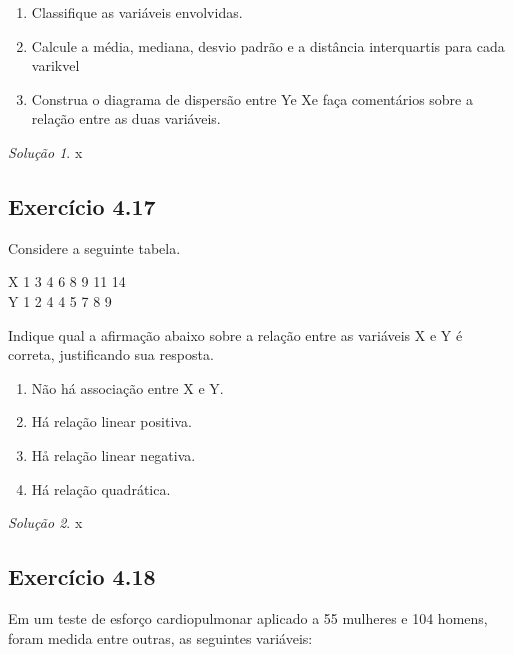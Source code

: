 \documentclass[
]{latex/krantz}
\providecommand{\tightlist}{%
  \setlength{\itemsep}{0pt}\setlength{\parskip}{0pt}}
\theoremstyle{definition}
\theoremstyle{definition}
\theoremstyle{definition}
\theoremstyle{definition}
\theoremstyle{remark}
\newtheorem*{solution}{Solução}
\begin{document}
\begin{enumerate}
\def\labelenumi{\alph{enumi}.}
\tightlist
\item
  Classifique as variáveis envolvidas.
\item
  Calcule a média, mediana, desvio padrão e a distância interquartis para cada varikvel
\item
  Construa o diagrama de dispersão entre Ye Xe faça comentários sobre a relação entre as duas variáveis.
\end{enumerate}

\begin{solution}
x
\end{solution}

\hypertarget{exr4-17}{%
\subsection*{Exercício 4.17}\label{exr4-17}}

Considere a seguinte tabela.

X \textbar{} 1 \textbar{} 3 \textbar{} 4 \textbar{} 6 \textbar{} 8 \textbar{} 9 \textbar{} 11 \textbar{} 14 \textbar{}\\
Y \textbar{} 1 \textbar{} 2 \textbar{} 4 \textbar{} 4 \textbar{} 5 \textbar{} 7 \textbar{} 8 \textbar{} 9 \textbar{}

Indique qual a afirmação abaixo sobre a relação entre as variáveis X e Y é correta, justificando sua resposta.

\begin{enumerate}
\def\labelenumi{\alph{enumi})}
\tightlist
\item
  Não há associação entre X e Y.
\item
  Há relação linear positiva.
\item
  Hå relação linear negativa.
\item
  Há relação quadrática.
\end{enumerate}

\begin{solution}
x
\end{solution}

\hypertarget{exr4-18}{%
\subsection*{Exercício 4.18}\label{exr4-18}}

Em um teste de esforço cardiopulmonar aplicado a 55 mulheres e 104 homens, foram medida entre outras, as seguintes variáveis:
\end{document}
